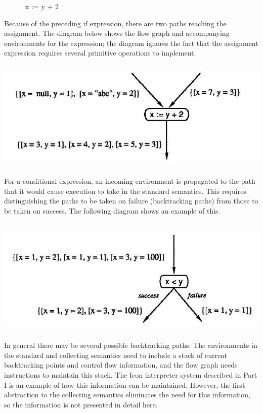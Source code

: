 {\ttfamily\mdseries
\ \ \ \ \ \ x := y + 2}


Because of the preceding if expression, there are two paths reaching
the assignment. The diagram below shows the flow graph and
accompanying environments for the expression; the diagram ignores the
fact that the assignment expression requires several primitive
operations to implement.


 \includegraphics[width=6.0in,height=2.1in]{kw/figure3-5.png}  


For a conditional expression, an incoming environment is propagated to
the path that it would cause execution to take in the standard
semantics. This requires distinguishing the paths to be taken on
failure (backtracking paths) from those to be taken on success. The
following diagram shows an example of this.

{\centering  \includegraphics[width=5.3992in,height=2.2299in]{kw/figure3-6.png} \par}

In general there may be several possible backtracking paths. The
environments in the standard and collecting semantics need to include
a stack of current backtracking points and control flow information,
and the flow graph needs instructions to maintain this stack. The Icon
interpreter system described in Part I is an example of how this
information can be maintained. However, the first abstraction to the
collecting semantics eliminates the need for this information, so the
information is not presented in detail here.

